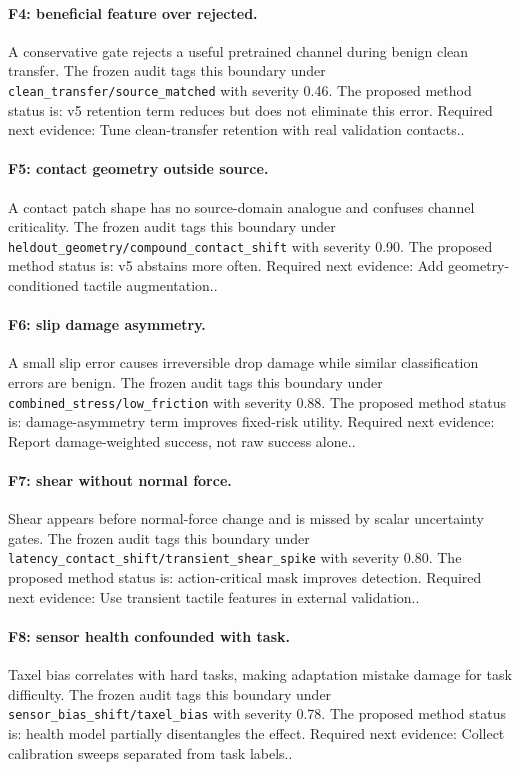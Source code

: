 \documentclass{article}
\begin{document}
\paragraph{F4: beneficial feature over rejected.} A conservative gate rejects a useful pretrained channel during benign clean transfer. The frozen audit tags this boundary under \texttt{clean\_transfer/source\_matched} with severity 0.46. The proposed method status is: v5 retention term reduces but does not eliminate this error. Required next evidence: Tune clean-transfer retention with real validation contacts..

\paragraph{F5: contact geometry outside source.} A contact patch shape has no source-domain analogue and confuses channel criticality. The frozen audit tags this boundary under \texttt{heldout\_geometry/compound\_contact\_shift} with severity 0.90. The proposed method status is: v5 abstains more often. Required next evidence: Add geometry-conditioned tactile augmentation..

\paragraph{F6: slip damage asymmetry.} A small slip error causes irreversible drop damage while similar classification errors are benign. The frozen audit tags this boundary under \texttt{combined\_stress/low\_friction} with severity 0.88. The proposed method status is: damage-asymmetry term improves fixed-risk utility. Required next evidence: Report damage-weighted success, not raw success alone..

\paragraph{F7: shear without normal force.} Shear appears before normal-force change and is missed by scalar uncertainty gates. The frozen audit tags this boundary under \texttt{latency\_contact\_shift/transient\_shear\_spike} with severity 0.80. The proposed method status is: action-critical mask improves detection. Required next evidence: Use transient tactile features in external validation..

\paragraph{F8: sensor health confounded with task.} Taxel bias correlates with hard tasks, making adaptation mistake damage for task difficulty. The frozen audit tags this boundary under \texttt{sensor\_bias\_shift/taxel\_bias} with severity 0.78. The proposed method status is: health model partially disentangles the effect. Required next evidence: Collect calibration sweeps separated from task labels..
\end{document}
